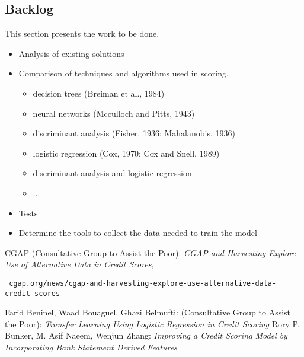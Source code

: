 \documentclass[12pt,a4paper]{amsart}
\numberwithin{equation}{section}
\theoremstyle{plain}
\theoremstyle{definition}
\begin{document}
\subsection{Backlog}
This section presents the work to be done.\\
\begin{itemize}
 \item Analysis of existing solutions
 \item Comparison of techniques and algorithms used in scoring.
\begin{itemize}
  \item decision trees (Breiman et al., 1984)
  \item neural networks (Mcculloch and Pitts, 1943)
  \item discriminant analysis (Fisher, 1936; Mahalanobis, 1936)
  \item logistic regression (Cox, 1970; Cox and Snell, 1989)
  \item discriminant analysis and logistic regression
  \item ...
\end{itemize}
 \item Tests
 \item Determine the tools to collect the data needed to train the model

\end{itemize}



\begin{thebibliography}{99} 

 CGAP (Consultative Group to Assist the Poor): \textit{CGAP and Harvesting Explore Use of Alternative Data in Credit Scores}, \begin{verbatim} cgap.org/news/cgap-and-harvesting-explore-use-alternative-data-credit-scores
\end{verbatim}
 Farid Beninel, Waad Bouaguel, Ghazi Belmufti: (Consultative Group to Assist the Poor): \textit{Transfer Learning Using Logistic Regression in Credit Scoring}
 Rory P. Bunker, M. Asif Naeem, Wenjun Zhang: \textit{Improving a Credit Scoring Model by Incorporating Bank Statement Derived Features}

\end{thebibliography}
\end{document}
